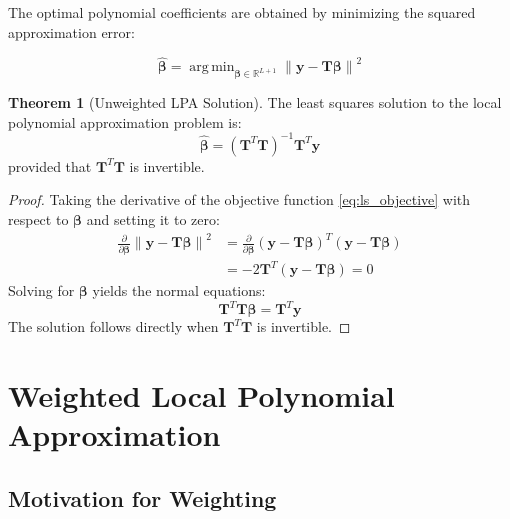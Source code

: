 \documentclass[12pt]{article}
\DeclareMathOperator{\argmin}{arg\,min}
\renewcommand{\vec}[1]{\mathbf{#1}}
\newcommand{\mat}[1]{\mathbf{#1}}
\newcommand{\norm}[1]{\left\|#1\right\|}
\newcommand{\R}{\mathbb{R}}
\theoremstyle{definition}
\newtheorem{theorem}{Theorem}[section]
\begin{document}
The optimal polynomial coefficients are obtained by minimizing the squared approximation error:

\begin{equation}
    \label{eq:ls_objective}
    \hat{\vec{\beta}} = \argmin_{\vec{\beta} \in \R^{L+1}} \norm{\vec{y} - \mat{T}\vec{\beta}}^2
\end{equation}

\begin{theorem}[Unweighted LPA Solution]
    \label{thm:unweighted_lpa}
    The least squares solution to the local polynomial approximation problem is:
    \begin{equation}
        \label{eq:ls_solution}
        \hat{\vec{\beta}} = (\mat{T}^T\mat{T})^{-1}\mat{T}^T\vec{y}
    \end{equation}
    provided that $\mat{T}^T\mat{T}$ is invertible.
\end{theorem}

\begin{proof}
    Taking the derivative of the objective function \eqref{eq:ls_objective} with respect to $\vec{\beta}$ and setting it to zero:
    \begin{align}
        \frac{\partial}{\partial \vec{\beta}} \norm{\vec{y} - \mat{T}\vec{\beta}}^2 & = \frac{\partial}{\partial \vec{\beta}} (\vec{y} - \mat{T}\vec{\beta})^T(\vec{y} - \mat{T}\vec{\beta}) \\
                                                                                    & = -2\mat{T}^T(\vec{y} - \mat{T}\vec{\beta}) = 0
    \end{align}
    Solving for $\vec{\beta}$ yields the normal equations:
    \begin{equation}
        \mat{T}^T\mat{T}\vec{\beta} = \mat{T}^T\vec{y}
    \end{equation}
    The solution follows directly when $\mat{T}^T\mat{T}$ is invertible.
\end{proof}

\newpage

\section{Weighted Local Polynomial Approximation}
\label{sec:weighted_lpa}

\subsection{Motivation for Weighting}
\label{subsec:weight_motivation}
\end{document}
